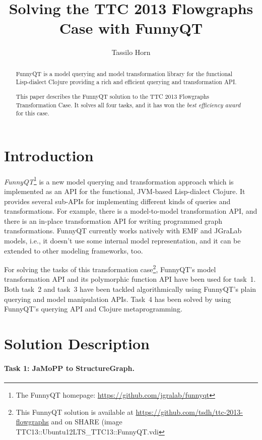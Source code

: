 \documentclass[submission]{eptcs}
\title{Solving the TTC 2013 Flowgraphs Case with FunnyQT}
\author{Tassilo Horn
  \email{horn@uni-koblenz.de}
  \institute{Institute for Software Technology, University Koblenz-Landau, Germany}}
\begin{document}
\maketitle

\begin{abstract}
  FunnyQT is a model querying and model transformation library for the
  functional Lisp-dialect Clojure providing a rich and efficient querying and
  transformation API.

  This paper describes the FunnyQT solution to the TTC 2013 Flowgraphs
  Transformation Case.  It solves all four tasks, and it has won the \emph{best
    efficiency award} for this case.
\end{abstract}

\section{Introduction}
\label{sec:introduction}

\emph{FunnyQT}\footnote{The FunnyQT homepage:
  \url{https://github.com/jgralab/funnyqt}} is a new model querying and
transformation approach which is implemented as an API for the functional,
JVM-based Lisp-dialect Clojure.  It provides several sub-APIs for implementing
different kinds of queries and transformations.  For example, there is a
model-to-model transformation API, and there is an in-place transformation API
for writing programmed graph transformations.  FunnyQT currently works natively
with EMF and JGraLab models, i.e., it doesn't use some internal model
representation, and it can be extended to other modeling frameworks, too.

For solving the tasks of this transformation case\footnote{This FunnyQT
  solution is available at \url{https://github.com/tsdh/ttc-2013-flowgraphs}
  and on SHARE (image \textsf{TTC13::Ubuntu12LTS\_TTC13::FunnyQT.vdi}},
FunnyQT's model transformation API and its polymorphic function API have been
used for task~1.  Both task~2 and task~3 have been tackled algorithmically
using FunnyQT's plain querying and model manipulation APIs.  Task~4 has been
solved by using FunnyQT's querying API and Clojure metaprogramming.

\section{Solution Description}
\label{sec:solution-description}


\paragraph{Task 1: JaMoPP to StructureGraph.}
\label{sec:task-1}
\end{document}
